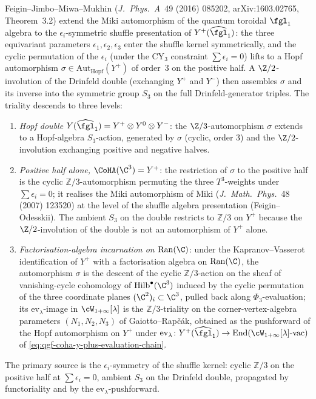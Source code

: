 \begin{remark}
\label{rem:qgf-miki-triality-three-levels}
Feigin--Jimbo--Miwa--Mukhin (\emph{J.\ Phys.\ A}\ 49 (2016) 085202, arXiv:1603.02765, Theorem~3.2) extend the Miki automorphism of the quantum toroidal $\fgl_1$ algebra to the $\epsilon_i$-symmetric shuffle presentation of $Y^+(\widehat{\fgl}_1)$: the three equivariant parameters $\epsilon_1,\epsilon_2,\epsilon_3$ enter the shuffle kernel symmetrically, and the cyclic permutation of the $\epsilon_i$ (under the CY$_3$ constraint $\sum\epsilon_i = 0$) lifts to a Hopf automorphism $\sigma\in\mathrm{Aut}_{\mathrm{Hopf}}(Y^+)$ of order~$3$ on the positive half. A $\Z/2$-involution of the Drinfeld double (exchanging $Y^+$ and $Y^-$) then assembles $\sigma$ and its inverse into the symmetric group $S_3$ on the full Drinfeld-generator triples. The triality descends to three levels:
\begin{enumerate}[label=\textup{(\roman*)}]
 \item \emph{Hopf double $Y(\widehat{\fgl}_1) = Y^+ \otimes Y^0 \otimes Y^-$}: the $\Z/3$-automorphism $\sigma$ extends to a Hopf-algebra $S_3$-action, generated by $\sigma$ (cyclic, order $3$) and the $\Z/2$-involution exchanging positive and negative halves.
 \item \emph{Positive half alone, $\CoHA(\C^3)=Y^+$}: the restriction of $\sigma$ to the positive half is the cyclic $\mathbb{Z}/3$-automorphism permuting the three $T^3$-weights under $\sum\epsilon_i = 0$; it realises the Miki automorphism of Miki (\emph{J.\ Math.\ Phys.}\ 48 (2007) 123520) at the level of the shuffle algebra presentation (Feigin--Odesskii). The ambient $S_3$ on the double restricts to $\mathbb{Z}/3$ on $Y^+$ because the $\Z/2$-involution of the double is not an automorphism of $Y^+$ alone.
 \item \emph{Factorisation-algebra incarnation on $\mathrm{Ran}(\C)$}: under the Kapranov--Vasserot identification of $Y^+$ with a factorisation algebra on $\mathrm{Ran}(\C)$, the automorphism $\sigma$ is the descent of the cyclic $\mathbb{Z}/3$-action on the sheaf of vanishing-cycle cohomology of $\mathrm{Hilb}^\bullet(\C^3)$ induced by the cyclic permutation of the three coordinate planes $(\C^2)_i\subset\C^3$, pulled back along $\Phi_3$-evaluation; its $\mathrm{ev}_\lambda$-image in $\cW_{1+\infty}[\lambda]$ is the $\mathbb{Z}/3$-triality on the corner-vertex-algebra parameters $(N_1,N_2,N_3)$ of Gaiotto--Rap\v{c}\'ak, obtained as the pushforward of the Hopf automorphism on
$Y^+$ under
$\mathrm{ev}_\lambda\colon Y^+(\widehat{\fgl}_1)\to
\mathrm{End}(\cW_{1+\infty}[\lambda]\text{-}\mathrm{vac})$
of \eqref{eq:qgf-coha-y-plus-evaluation-chain}.
\end{enumerate}
The primary source is the $\epsilon_i$-symmetry of the shuffle kernel: cyclic $\mathbb{Z}/3$ on the positive half at $\sum\epsilon_i = 0$, ambient $S_3$ on the Drinfeld double, propagated by functoriality and by the $\mathrm{ev}_\lambda$-pushforward.
\end{remark}

